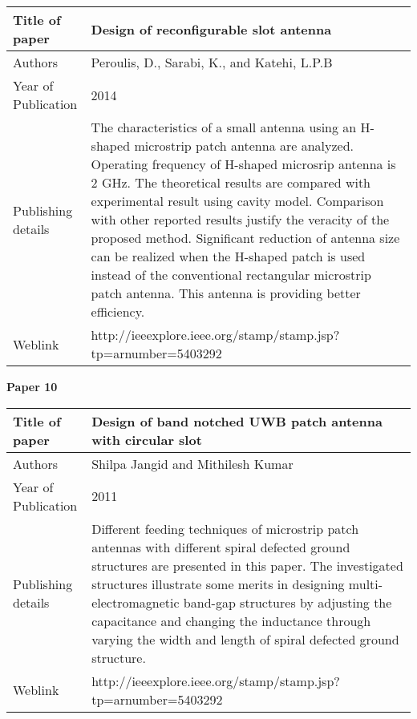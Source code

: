 \documentclass[12pt]{article}
\begin{document}
	
		  \begin{center}
		  	\begin{table}[H]
		  		\centering
		  		\begin{tabular}{ |l|p{11cm}| }
		  			\hline
		  			Title of paper &  Design of reconfigurable slot antenna  \\
		  			\hline
		  			Authors & Peroulis, D., Sarabi, K., and Katehi, L.P.B \\
		  			\hline
		  			Year of Publication & 2014 \\
		  			\hline
		  			Publishing details & The characteristics of a small antenna using an H-shaped microstrip patch antenna are analyzed. Operating frequency of H-shaped microsrip antenna is 2 GHz. The theoretical results are compared with experimental result using cavity model. Comparison with other reported results justify the veracity of the proposed method. Significant reduction of antenna size can be realized when the H-shaped patch is used instead of the conventional rectangular microstrip patch antenna. This antenna is providing better efficiency.\\
		  			\hline
		  			Weblink & http://ieeexplore.ieee.org/stamp/stamp.jsp?tp=arnumber=5403292 \\
		  			\hline			 
		  		\end{tabular}		
		  		
		  	\end{table}
		  \end{center}
		  
			 	\begin{flushleft}
			 		\textbf{Paper 10}
			 	\end{flushleft}
			 	
		 
		 
		    \begin{center}
		    	\begin{table}[H]
		    		\centering
		    		\begin{tabular}{ |l|p{11cm}| }
		    			\hline
		    			Title of paper &  Design of band notched UWB patch antenna with circular slot  \\
		    			\hline
		    			Authors & Shilpa Jangid and Mithilesh Kumar \\
		    			\hline
		    			Year of Publication & 2011 \\
		    			\hline
		    			Publishing details & Different feeding techniques of microstrip patch antennas with different spiral defected ground structures are presented in this paper. The investigated structures illustrate some merits in designing multi-electromagnetic band-gap structures by adjusting the capacitance and changing the inductance through varying the width and length of spiral defected ground structure.\\
		    			\hline
		    			Weblink & http://ieeexplore.ieee.org/stamp/stamp.jsp?tp=arnumber=5403292 \\
		    			\hline			 
		    		\end{tabular}		
		    		
		    	\end{table}
		    \end{center}
		    
\end{document}
